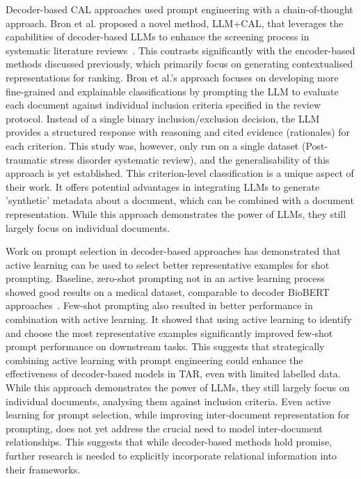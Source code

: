 \documentclass[10pt,oneside]{book}
\begin{document}
Decoder-based CAL approaches used prompt engineering with a chain-of-thought approach. Bron et al. proposed a novel method, LLM+CAL, that leverages the capabilities of decoder-based LLMs to enhance the screening process in systematic literature reviews~\cite{bron_combining_2024}. This contrasts significantly with the encoder-based methods discussed previously, which primarily focus on generating contextualised representations for ranking. Bron et al.'s approach focuses on developing more fine-grained and explainable classifications by prompting the LLM to evaluate each document against individual inclusion criteria specified in the review protocol. Instead of a single binary inclusion/exclusion decision, the LLM provides a structured response with reasoning and cited evidence (rationales) for each criterion. This study was, however, only run on a single dataset (Post-traumatic stress disorder systematic review), and the generalisability of this approach is yet established. This criterion-level classification is a unique aspect of their work. It offers potential advantages in integrating LLMs to generate 'synthetic' metadata about a document, which can be combined with a document representation. While this approach demonstrates the power of LLMs, they still largely focus on individual documents.

Work on prompt selection in decoder-based approaches has demonstrated that active learning can be used to select better representative examples for shot prompting.  Baseline, zero-shot prompting not in an active learning process showed good results on a medical dataset, comparable to decoder BioBERT approaches~\cite{wang_zero-shot_2024}. Few-shot prompting also resulted in better performance \cite{margatina_importance_2022} in combination with active learning. It showed that using active learning to identify and choose the most representative examples significantly improved few-shot prompt performance on downstream tasks. This suggests that strategically combining active learning with prompt engineering could enhance the effectiveness of decoder-based models in TAR, even with limited labelled data. While this approach demonstrates the power of LLMs, they still largely focus on individual documents, analysing them against inclusion criteria. Even active learning for prompt selection, while improving inter-document representation for prompting, does not yet address the crucial need to model inter-document relationships.  This suggests that while decoder-based methods hold promise, further research is needed to explicitly incorporate relational information into their frameworks. 
\end{document}

